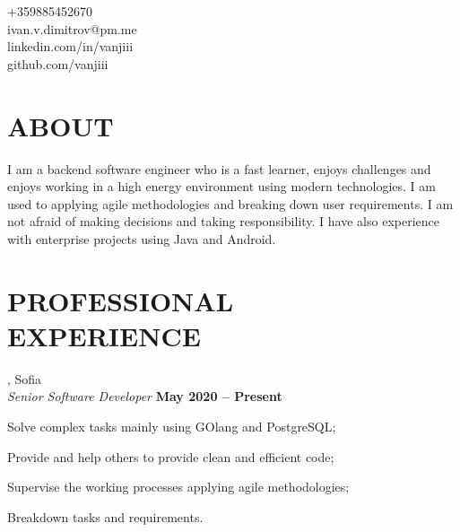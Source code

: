 \documentclass[margin,line]{resume}
\begin{document}
{
    \sc
    \hfill +359885452670		\vspace{0mm}\\\vspace{0mm}%
    \hfill ivan.v.dimitrov@pm.me        \vspace{0mm}\\\vspace{0mm}%
    \hfill linkedin.com/in/vanjiii      \vspace{0mm}\\\vspace{0mm}%
    \hfill github.com/vanjiii		\vspace{0mm}\\\vspace{-10mm}%
}

\begin{resume}
\vspace{1mm}

\section{\mysidestyle\textbf{\large{A}\small{BOUT}}}

    I am a backend software engineer who is a fast learner, enjoys
    challenges and enjoys working in a high energy environment using
    modern technologies. I am used to applying agile methodologies and
    breaking down user requirements. I am not afraid of making
    decisions and taking responsibility. I have also experience with
    enterprise projects using Java and Android.

\sectionline%

    \section{\mysidestyle\textbf{\large{P}\small{ROFESSIONAL\\EXPERIENCE}}}

    \textbf{}, Sofia \vspace{2mm}\\\vspace{1mm}%
    \textsl{Senior Software Developer} \hfill \textbf{May 2020 {--} Present}\\
    \begin{list2}
        \item Solve complex tasks mainly using GOlang and PostgreSQL;\@
        \item Provide and help others to provide clean and efficient code;
	\item Supervise the working processes applying agile methodologies;
        \item Breakdown tasks and requirements.
    \end{list2}


\end{resume}
\end{document}
